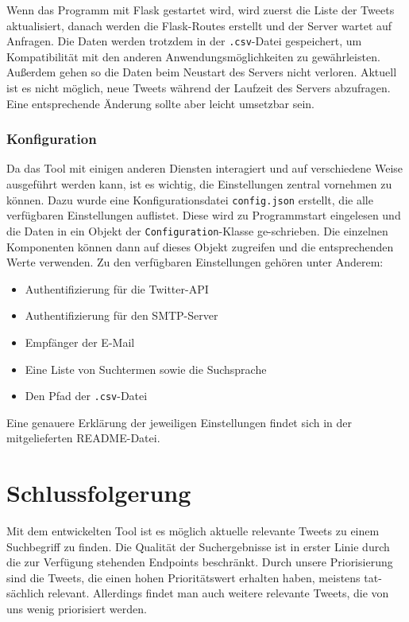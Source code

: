 \documentclass[runningheads]{llncs}
\begin{document}
Wenn das Programm mit Flask gestartet wird, wird zuerst die Liste der Tweets aktualisiert, danach werden die Flask-Routes erstellt und der Server wartet auf Anfragen.
Die Daten werden trotzdem in der \texttt{.csv}-Datei gespeichert, um Kompatibilität mit den anderen Anwendungsmöglichkeiten zu gewährleisten.
Außerdem gehen so die Daten beim Neustart des Servers nicht verloren.
Aktuell ist es nicht möglich, neue Tweets während der Laufzeit des Servers abzufragen.
Eine entsprechende Änderung sollte aber leicht umsetzbar sein.

\subsubsection{Konfiguration}
Da das Tool mit einigen anderen Diensten interagiert und auf verschiedene Weise ausgeführt werden kann, ist es wichtig, die Einstellungen zentral vornehmen zu können.
Dazu wurde eine Konfigurationsdatei \texttt{config.json} erstellt, die alle verfügbaren Einstellungen auflistet.
Diese wird zu Programmstart eingelesen und die Daten in ein Objekt der \texttt{Configuration}-Klasse ge-schrieben.
Die einzelnen Komponenten können dann auf dieses Objekt zugreifen und die entsprechenden Werte verwenden.
Zu den verfügbaren Einstellungen gehören unter Anderem:
\begin{itemize} 
    \item Authentifizierung für die Twitter-API
    \item Authentifizierung für den SMTP-Server
    \item Empfänger der E-Mail
    \item Eine Liste von Suchtermen sowie die Suchsprache
    \item Den Pfad der \texttt{.csv}-Datei
\end{itemize} 
Eine genauere Erklärung der jeweiligen Einstellungen findet sich in der mitgelieferten README-Datei.

\section{Schlussfolgerung}
Mit dem entwickelten Tool ist es möglich aktuelle relevante Tweets zu einem Suchbegriff zu finden.
Die Qualität der Suchergebnisse ist in erster Linie durch die zur Verfügung stehenden Endpoints beschränkt.
Durch unsere Priorisierung sind die Tweets, die einen hohen Prioritätswert erhalten haben, meistens tat-sächlich relevant.
Allerdings findet man auch weitere relevante Tweets, die von uns wenig priorisiert werden.
\end{document}
